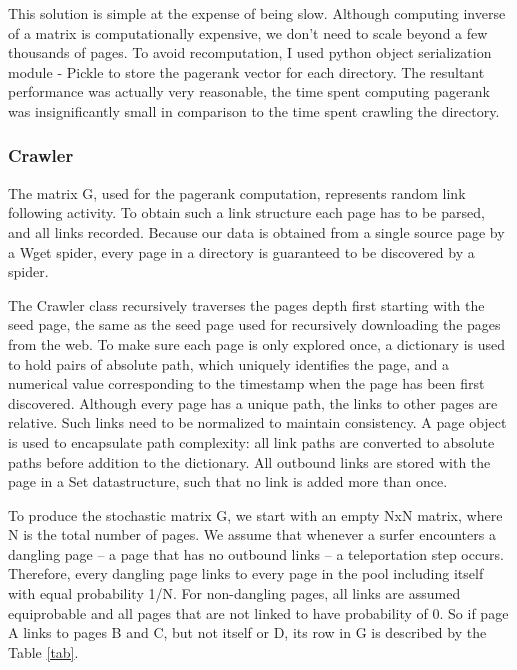 \documentclass[12pt,twoside,notitlepage]{report}
\begin{document}
This solution is simple at the expense of being slow. Although computing
inverse of a matrix is computationally expensive, we don't need to scale beyond
a few thousands of pages.  To avoid recomputation, I used python object
serialization module - Pickle to store the pagerank vector for each directory.
The resultant performance was actually very reasonable, the time spent
computing pagerank was insignificantly small in comparison to the time spent
crawling the directory.

\subsubsection*{Crawler}
The matrix G, used for the pagerank computation, represents random link
following activity. To obtain such a link structure each page has to be parsed,
and all links recorded. Because our data is obtained from a single source page
by a Wget spider, every page in a directory is guaranteed to be discovered by a
spider.

The Crawler class recursively traverses the pages depth first starting with the seed page,
the same as the seed page used for recursively downloading the pages from the
web. To make sure each page is only explored once, a dictionary is used to
hold pairs of absolute path, which uniquely identifies the page, and a
numerical value corresponding to the timestamp when the page has been first
discovered.
Although every page has a unique path, the links to other pages are relative.
Such links need to be normalized to maintain consistency.
A page object is used to encapsulate path complexity: all link paths are
converted to absolute paths before addition to the dictionary.
All outbound links are stored with the page in a Set datastructure,
such that no link is added more than once. 

To produce the stochastic matrix G, we start with an empty NxN matrix, where N
is the total number of pages. We assume that whenever a surfer encounters a dangling page -- a page that has no
outbound links -- a teleportation step occurs. Therefore, every dangling page
links to every page in the pool including itself with equal probability 1/N. For non-dangling
pages, all links are assumed equiprobable and all pages that are not linked to
have probability of 0. So if page A links to pages B and C, but not itself or
D, its row in G is described by the Table \ref{tab}.
\end{document}
